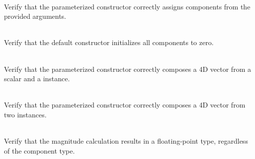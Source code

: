 \begin{DoxyRefList}
\item[{\parbox[t]{\linewidth}{Member \doxylink{group___f_g_m___vec4___init_gabf80101e26b45033f50dbfe802fb1703}{Vector4\+DInitialization\+\_\+\+Constructor\+Initializes\+Vectors\+With\+Correct\+Value} ()}}]\hfill \\
\label{test__test000104}%
%
Verify that the  parameterized constructor correctly assigns components from the provided arguments.  
\item[{\parbox[t]{\linewidth}{Member \doxylink{group___f_g_m___vec4___init_gab191c534e6251a89f78d3904cafa94a7}{Vector4\+DInitialization\+\_\+\+Empty\+Constructor\+Initializes\+Zero\+Vector} ()}}]\hfill \\
\label{test__test000103}%
%
Verify that the  default constructor initializes all components to zero.  
\item[{\parbox[t]{\linewidth}{Member \doxylink{group___f_g_m___vec4___init_gaaea8a2b2a2c24e693c62c839b9213e84}{Vector4\+DInitialization\+\_\+\+Scalar\+And3\+DVector\+Can\+Initialize\+A4\+DVector} ()}}]\hfill \\
\label{test__test000107}%
%
Verify that the  parameterized constructor correctly composes a 4D vector from a scalar and a  instance.  
\item[{\parbox[t]{\linewidth}{Member \doxylink{group___f_g_m___vec4___init_ga5a187bbade6d6f8ed6f917aba6065e4a}{Vector4\+DInitialization\+\_\+\+Two2\+DVectors\+Can\+Initialize\+A4\+DVector} ()}}]\hfill \\
\label{test__test000105}%
%
Verify that the  parameterized constructor correctly composes a 4D vector from two  instances.  
\item[{\parbox[t]{\linewidth}{Member \doxylink{group___f_g_m___vec4___magnitude_ga94fda7188a9c870ef0f10cbf062c5584}{Vector4\+DMagnitude\+\_\+\+Magnitude\+Is\+Always\+Typed\+Promoted\+To\+Floating\+Point\+Type} ()}}]\hfill \\
\label{test__test000111}%
%
Verify that the  magnitude calculation results in a floating-\/point type, regardless of the component type.  

\end{DoxyRefList}
